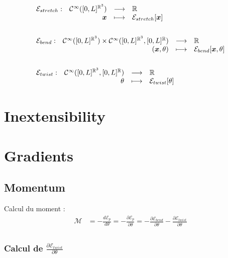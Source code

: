 \begin{align}
	&\begin{array}{lrcl} \mathcal{E}_{stretch}: & \mathcal{C}^{\infty}([0,L]^{\mathbb{R}^3}) & \longrightarrow & \mathbb{R} \\ & \boldsymbol{x} & \longmapsto & \mathcal{E}_{stretch}[\boldsymbol{x}] \end{array}
	\\ \notag\\
	&\begin{array}{lrcl} \mathcal{E}_{bend}: & \mathcal{C}^{\infty}([0,L]^{\mathbb{R}^3}) \times \mathcal{C}^\infty([0,L]^{\mathbb{R}^3},[0,L]^{\mathbb{R}}) & \longrightarrow & \mathbb{R} \\ & (\boldsymbol{x},\theta) & \longmapsto & \mathcal{E}_{bend}[\boldsymbol{x},\theta] \end{array}
	\\ \notag\\
	&\begin{array}{lrcl} \mathcal{E}_{twist}: & \mathcal{C}^\infty([0,L]^{\mathbb{R}^3},[0,L]^{\mathbb{R}}) & \longrightarrow & \mathbb{R} \\ & \theta & \longmapsto & \mathcal{E}_{twist}[\theta] \end{array}
\end{align}

\section{Inextensibility}





\section{Gradients}


\subsection{Momentum}

Calcul du moment :
\begin{align}
	\mathcal{M} & = -\frac{d\mathcal{E}_p}{d\theta} =  - \frac{\partial \mathcal{E}_p}{\partial \theta} = - \frac{\partial \mathcal{E}_{bend}}{\partial \theta} - \frac{\partial \mathcal{E}_{twist}}{\partial \theta} \\[0.5em]
\end{align}


\subsubsection{Calcul de $\frac{\partial \mathcal{E}_{twist}}{\partial \theta}$}

